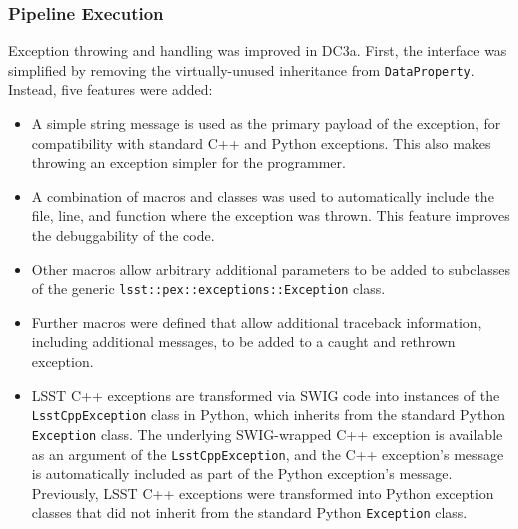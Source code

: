 
\subsubsection{Pipeline Execution}


Exception throwing and handling was improved in DC3a. First, the
interface was simplified by removing the virtually-unused inheritance
from {\tt DataProperty}.  Instead, five features were added:

\begin{itemize}

\item A simple string message is used as the primary payload of the
exception, for compatibility with standard C++ and Python exceptions.
This also makes throwing an exception simpler for the programmer.

\item A combination of macros and classes was used to automatically
include the file, line, and function where the exception was thrown.
This feature improves the debuggability of the code.

\item Other macros allow arbitrary additional parameters to be added to
subclasses of the generic {\tt lsst::pex::exceptions::Exception} class.

\item Further macros were defined that allow additional traceback
information, including additional messages, to be added to a caught and
rethrown exception.

\item LSST C++ exceptions are transformed via SWIG code into instances
of the {\tt LsstCppException} class in Python, which inherits from the
standard Python {\tt Exception} class.  The underlying SWIG-wrapped C++
exception is available as an argument of the {\tt LsstCppException}, and
the C++ exception's message is automatically included as part of the
Python exception's message.  Previously, LSST C++ exceptions were
transformed into Python exception classes that did not inherit from the
standard Python {\tt Exception} class.

\end{itemize}
